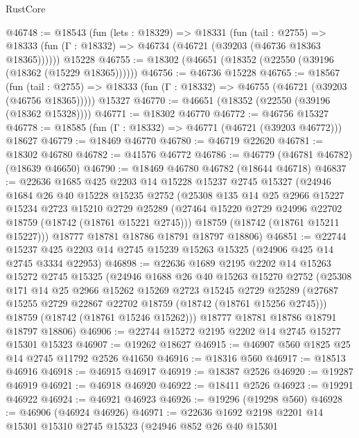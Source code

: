 \begin{lexlean}{RustCore}
\begin{coremodule}
@46748 := @18543
    (fun (lets : @18329) =>
    @18331
      (fun (tail : @2755) =>
      @18333 (fun (Γ : @18332) => @46734 (@46721 (@39203 (@46736 @18363 @18365))))))
    @15228
@46755 := @18302 (@46651 (@18352 (@22550 (@39196 (@18362 (@15229 @18365))))))
@46756 := @46736 @15228
@46765 := @18567
    (fun (tail : @2755) => @18333 (fun (Γ : @18332) => @46755 (@46721 (@39203 (@46756 @18365)))))
    @15327
@46770 := @46651 (@18352 (@22550 (@39196 (@18362 @15328))))
@46771 := @18302 @46770
@46772 := @46756 @15327
@46778 := @18585 (fun (Γ : @18332) => @46771 (@46721 (@39203 @46772))) @18627
@46779 := @18469 @46770
@46780 := @46719 @22620
@46781 := @18302 @46780
@46782 := @41576 @46772
@46786 := @46779 (@46781 @46782) (@18639 @46650)
@46790 := @18469 @46780 @46782 (@18644 @46718)
@46837 := @22636
    @1685
    @425
    @2203
    @14
    @15228
    @15237
    @2745
    @15327
    (@24946
      @1684
      @26
      @40
      @15228
      @15235
      @2752
      (@25308
        @135
        @14
        @25
        @2966
        @15227
        @15234
        @2723
        @15210
        @2729
        @25289
        (@27464 @15220 @2729 @24996 @22702 @18759 (@18742 (@18761 @15221 @2745)))
        @18759
        (@18742 (@18761 @15211 @15227)))
      @18777
      @18781
      @18786
      @18791
      @18797
      @18806)
@46851 := @22744
    @15237
    @425
    @2203
    @14
    @2745
    @15239
    @15263
    @15325
    (@24906 @425 @14 @2745 @3334 @22953)
@46898 := @22636
    @1689
    @2195
    @2202
    @14
    @15263
    @15272
    @2745
    @15325
    (@24946
      @1688
      @26
      @40
      @15263
      @15270
      @2752
      (@25308
        @171
        @14
        @25
        @2966
        @15262
        @15269
        @2723
        @15245
        @2729
        @25289
        (@27687 @15255 @2729 @22867 @22702 @18759 (@18742 (@18761 @15256 @2745)))
        @18759
        (@18742 (@18761 @15246 @15262)))
      @18777
      @18781
      @18786
      @18791
      @18797
      @18806)
@46906 := @22744 @15272 @2195 @2202 @14 @2745 @15277 @15301 @15323
@46907 := @19262 @18627
@46915 := @46907 @560 @1825 @25 @14 @2745 @11792 @2526 @41650
@46916 := @18316 @560
@46917 := @18513 @46916
@46918 := @46915 @46917
@46919 := @18387 @2526
@46920 := @19287 @46919
@46921 := @46918 @46920
@46922 := @18411 @2526
@46923 := @19291 @46922
@46924 := @46921 @46923
@46926 := @19296 (@19298 @560)
@46928 := @46906 (@46924 @46926)
@46971 := @22636
    @1692
    @2198
    @2201
    @14
    @15301
    @15310
    @2745
    @15323
    (@24946
      @852
      @26
      @40
      @15301

\end{coremodule}
\end{lexlean}
